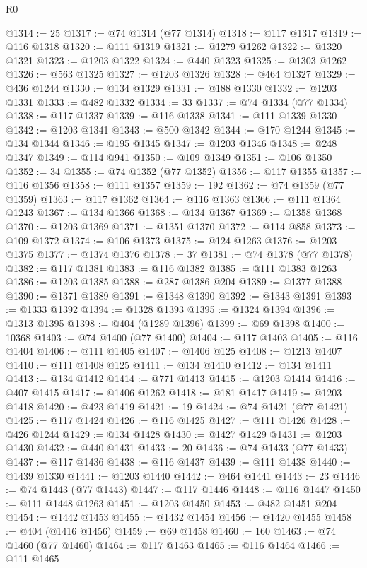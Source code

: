 \begin{lexlean}{R0}
\begin{coremodule}
@1314 := 25
@1317 := @74 @1314 (@77 @1314)
@1318 := @117 @1317
@1319 := @116 @1318
@1320 := @111 @1319
@1321 := @1279 @1262
@1322 := @1320 @1321
@1323 := @1203 @1322
@1324 := @440 @1323
@1325 := @1303 @1262
@1326 := @563 @1325
@1327 := @1203 @1326
@1328 := @464 @1327
@1329 := @436 @1244
@1330 := @134 @1329
@1331 := @188 @1330
@1332 := @1203 @1331
@1333 := @482 @1332
@1334 := 33
@1337 := @74 @1334 (@77 @1334)
@1338 := @117 @1337
@1339 := @116 @1338
@1341 := @111 @1339 @1330
@1342 := @1203 @1341
@1343 := @500 @1342
@1344 := @170 @1244
@1345 := @134 @1344
@1346 := @195 @1345
@1347 := @1203 @1346
@1348 := @248 @1347
@1349 := @114 @941
@1350 := @109 @1349
@1351 := @106 @1350
@1352 := 34
@1355 := @74 @1352 (@77 @1352)
@1356 := @117 @1355
@1357 := @116 @1356
@1358 := @111 @1357
@1359 := 192
@1362 := @74 @1359 (@77 @1359)
@1363 := @117 @1362
@1364 := @116 @1363
@1366 := @111 @1364 @1243
@1367 := @134 @1366
@1368 := @134 @1367
@1369 := @1358 @1368
@1370 := @1203 @1369
@1371 := @1351 @1370
@1372 := @114 @858
@1373 := @109 @1372
@1374 := @106 @1373
@1375 := @124 @1263
@1376 := @1203 @1375
@1377 := @1374 @1376
@1378 := 37
@1381 := @74 @1378 (@77 @1378)
@1382 := @117 @1381
@1383 := @116 @1382
@1385 := @111 @1383 @1263
@1386 := @1203 @1385
@1388 := @287 @1386 @204
@1389 := @1377 @1388
@1390 := @1371 @1389
@1391 := @1348 @1390
@1392 := @1343 @1391
@1393 := @1333 @1392
@1394 := @1328 @1393
@1395 := @1324 @1394
@1396 := @1313 @1395
@1398 := @404 (@1289 @1396)
@1399 := @69 @1398
@1400 := 10368
@1403 := @74 @1400 (@77 @1400)
@1404 := @117 @1403
@1405 := @116 @1404
@1406 := @111 @1405
@1407 := @1406 @125
@1408 := @1213 @1407
@1410 := @111 @1408 @125
@1411 := @134 @1410
@1412 := @134 @1411
@1413 := @134 @1412
@1414 := @771 @1413
@1415 := @1203 @1414
@1416 := @407 @1415
@1417 := @1406 @1262
@1418 := @181 @1417
@1419 := @1203 @1418
@1420 := @423 @1419
@1421 := 19
@1424 := @74 @1421 (@77 @1421)
@1425 := @117 @1424
@1426 := @116 @1425
@1427 := @111 @1426
@1428 := @426 @1244
@1429 := @134 @1428
@1430 := @1427 @1429
@1431 := @1203 @1430
@1432 := @440 @1431
@1433 := 20
@1436 := @74 @1433 (@77 @1433)
@1437 := @117 @1436
@1438 := @116 @1437
@1439 := @111 @1438
@1440 := @1439 @1330
@1441 := @1203 @1440
@1442 := @464 @1441
@1443 := 23
@1446 := @74 @1443 (@77 @1443)
@1447 := @117 @1446
@1448 := @116 @1447
@1450 := @111 @1448 @1263
@1451 := @1203 @1450
@1453 := @482 @1451 @204
@1454 := @1442 @1453
@1455 := @1432 @1454
@1456 := @1420 @1455
@1458 := @404 (@1416 @1456)
@1459 := @69 @1458
@1460 := 160
@1463 := @74 @1460 (@77 @1460)
@1464 := @117 @1463
@1465 := @116 @1464
@1466 := @111 @1465

\end{coremodule}
\end{lexlean}
